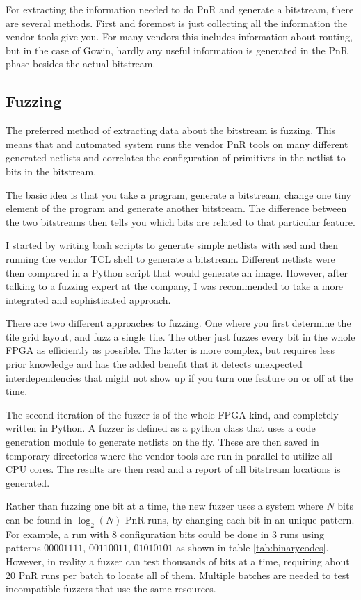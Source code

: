 \documentclass{article}
\begin{document}
For extracting the information needed to do PnR and generate a bitstream, there are several methods. First and foremost is just collecting all the information the vendor tools give you. For many vendors this includes information about routing, but in the case of Gowin, hardly any useful information is generated in the PnR phase besides the actual bitstream.

\subsection{Fuzzing}

The preferred method of extracting data about the bitstream is fuzzing. This means that and automated system runs the vendor PnR tools on many different generated netlists and correlates the configuration of primitives in the netlist to bits in the bitstream.

The basic idea is that you take a program, generate a bitstream, change one tiny element of the program and generate another bitstream. The difference between the two bitstreams then tells you which bits are related to that particular feature.

I started by writing bash scripts to generate simple netlists with sed and then running the vendor TCL shell to generate a bitstream. Different netlists were then compared in a Python script that would generate an image. However, after talking to a fuzzing expert at the company, I was recommended to take a more integrated and sophisticated approach.

There are two different approaches to fuzzing. One where you first determine the tile grid layout, and fuzz a single tile. The other just fuzzes every bit in the whole FPGA as efficiently as possible. The latter is more complex, but requires less prior knowledge and has the added benefit that it detects unexpected interdependencies that might not show up if you turn one feature on or off at the time.

The second iteration of the fuzzer is of the whole-FPGA kind, and completely written in Python. A fuzzer is defined as a python class that uses a code generation module to generate netlists on the fly. These are then saved in temporary directories where the vendor tools are run in parallel to utilize all CPU cores. The results are then read and a report of all bitstream locations is generated.

Rather than fuzzing one bit at a time, the new fuzzer uses a system where $N$ bits can be found in $\log_2(N)$ PnR runs, by changing each bit in an unique pattern. For example, a run with 8 configuration bits could be done in 3 runs using patterns $00001111$, $00110011$, $01010101$ as shown in table \ref{tab:binarycodes}. However, in reality a fuzzer can test thousands of bits at a time, requiring about 20 PnR runs per batch to locate all of them. Multiple batches are needed to test incompatible fuzzers that use the same resources.
\end{document}
